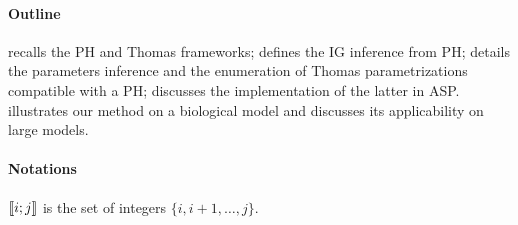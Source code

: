 \paragraph{Outline}
 recalls the PH and Thomas frameworks;
 defines the IG inference from PH;
 details the parameters inference and the enumeration of Thomas parametrizations compatible with a PH;
 discusses the implementation of the latter in ASP.
 illustrates our method on a biological model
and discusses its applicability on large models.

\paragraph{Notations}
$\llbracket i ; j \rrbracket$ is the set of integers $\{ i, i+1, \dots, j \}$.
